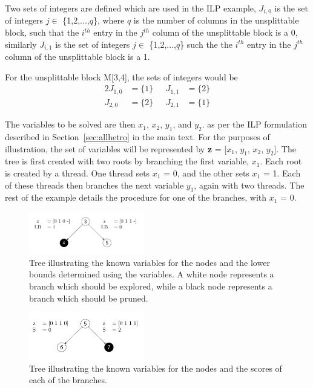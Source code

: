 \documentclass[10pt,twocolumn]{article}
\begin{document}
Two sets of integers are defined which are used in the ILP example, $J_{i,0}$ is the set of integers $j \in$
\{1,2,...,$q$\}, where $q$ is the number of columns in the unsplittable block, such that the $i^{th}$ entry in
the $j^{th}$ column of the unsplittable block is a 0, similarly $J_{i,1}$ is the set of integers $j \in$
\{1,2,...,$q$\} such the the $i^{th}$ entry in the $j^{th}$ column of the unsplittable block is a 1. 

For the unsplittable block M[3,4], the sets of integers would be 
\begin{alignat*}{2}
    J_{1,0} &= \{1\}     & \ \ \  J_{1,1} &= \{2\}        \\
    J_{2,0} &= \{2\}     & \ \ \  J_{2,1} &= \{1\}   
\end{alignat*}

The variables to be solved are then $x_1$, $x_2$, $y_1$, and $y_2$. as per the ILP formulation described in
Section~\ref{sec:allhetro} in the main text. For the purposes of illustration, the set
of variables will be represented by \textbf{z} = [$x_1$, $y_1$, $x_2$, $y_2$]. The tree is first created with
two roots by branching the first variable, $x_1$. Each root is created by a thread. One thread sets $x_1$ = 0, 
and the other sets $x_1$ = 1. Each of these threads then branches the next variable $y_1$, again with two
threads. The rest of the example details the procedure for one of the branches, with $x_1$ = 0.

\begin{figure}[t!]
    \centering
    \includegraphics[width=0.45\textwidth]{tree3}
    \caption{Tree illustrating the known variables for the nodes and the lower bounds determined using the
    variables. A white node represents a branch which should be explored, while a black node represents a
branch which should be pruned.}
    \label{fig:tree3}
\end{figure}
\begin{figure}[b!]
    \centering
    \includegraphics[width=0.45\textwidth]{tree5}
    \caption{Tree illustrating the known variables for the nodes and the scores of each of the branches.}
    \label{fig:tree5}
\end{figure}
\end{document}
